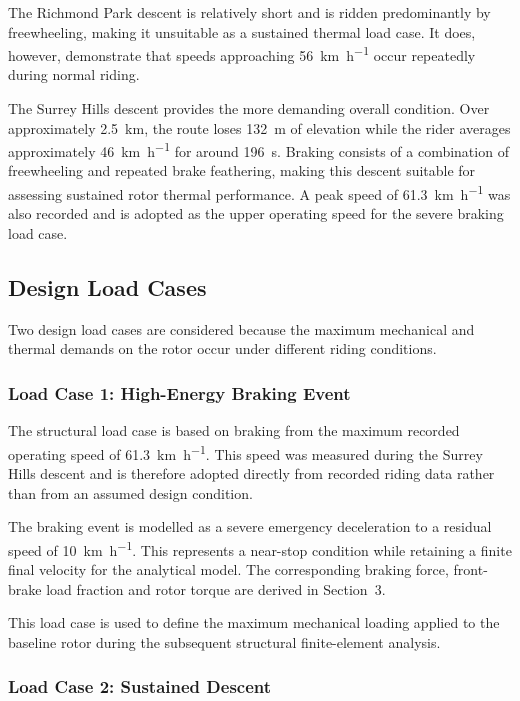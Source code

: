 \documentclass[11pt,a4paper]{article}
\begin{document}
The Richmond Park descent is relatively short and is ridden predominantly by
freewheeling, making it unsuitable as a sustained thermal load case. It does,
however, demonstrate that speeds approaching \SI{56}{km.h^{-1}} occur repeatedly
during normal riding.

The Surrey Hills descent provides the more demanding overall condition. Over
approximately \SI{2.5}{km}, the route loses \SI{132}{m} of elevation while the
rider averages approximately \SI{46}{km.h^{-1}} for around \SI{196}{s}. Braking
consists of a combination of freewheeling and repeated brake feathering, making
this descent suitable for assessing sustained rotor thermal performance. A peak
speed of \SI{61.3}{km.h^{-1}} was also recorded and is adopted as the upper
operating speed for the severe braking load case.


\subsection{Design Load Cases}

Two design load cases are considered because the maximum mechanical and thermal
demands on the rotor occur under different riding conditions.

\subsubsection{Load Case 1: High-Energy Braking Event}

The structural load case is based on braking from the maximum recorded
operating speed of \SI{61.3}{km.h^{-1}}. This speed was measured during the
Surrey Hills descent and is therefore adopted directly from recorded riding
data rather than from an assumed design condition.

The braking event is modelled as a severe emergency deceleration to a residual
speed of \SI{10}{km.h^{-1}}. This represents a near-stop condition while
retaining a finite final velocity for the analytical model. The corresponding
braking force, front-brake load fraction and rotor torque are derived in
Section~3.

This load case is used to define the maximum mechanical loading applied to the
baseline rotor during the subsequent structural finite-element analysis.

\subsubsection{Load Case 2: Sustained Descent}
\end{document}

